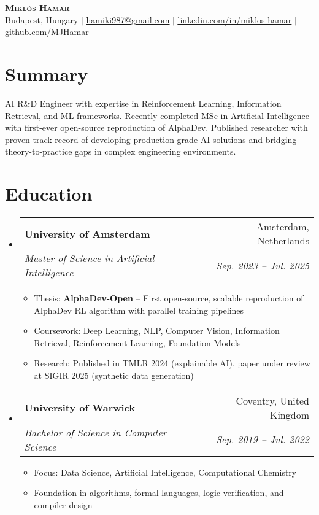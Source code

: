 \documentclass[letterpaper,11pt]{article}
\makeatletter
\newcommand{\resumeItem}[1]{
  \item\small{
    {#1 \vspace{-2pt}}
  }
}
\newcommand{\resumeSubheading}[4]{
  \vspace{-2pt}\item
    \begin{tabular*}{0.97\textwidth}[t]{l@{\extracolsep{\fill}}r}
      \textbf{#1} & #2 \\
      \textit{\small#3} & \textit{\small #4} \\
    \end{tabular*}\vspace{-7pt}
}
\newcommand{\resumeSubHeadingListStart}{\begin{itemize}[leftmargin=0.15in, label={}]}
\newcommand{\resumeSubHeadingListEnd}{\end{itemize}}
\newcommand{\resumeItemListStart}{\begin{itemize}}
\newcommand{\resumeItemListEnd}{\end{itemize}\vspace{-5pt}}
\makeatother
\begin{document}
\begin{center}
    \textbf{\Huge \scshape Miklós Hamar} \\ \vspace{1pt}
    \small Budapest, Hungary $|$ \href{mailto:hamiki987@gmail.com}{\underline{hamiki987@gmail.com}} $|$ 
    \href{https://linkedin.com/in/miklos-hamar}{\underline{linkedin.com/in/miklos-hamar}} $|$
    \href{https://github.com/MJHamar}{\underline{github.com/MJHamar}}
\end{center}


\section{Summary}
\small{AI R\&D Engineer with expertise in Reinforcement Learning, Information Retrieval, and ML frameworks. Recently completed MSc in Artificial Intelligence with first-ever open-source reproduction of AlphaDev. Published researcher with proven track record of developing production-grade AI solutions and bridging theory-to-practice gaps in complex engineering environments.}


\section{Education}
  \resumeSubHeadingListStart
    \resumeSubheading
      {University of Amsterdam}{Amsterdam, Netherlands}
      {Master of Science in Artificial Intelligence}{Sep. 2023 -- Jul. 2025}
      \resumeItemListStart
        \resumeItem{Thesis: \textbf{AlphaDev-Open} -- First open-source, scalable reproduction of AlphaDev RL algorithm with parallel training pipelines}
        \resumeItem{Coursework: Deep Learning, NLP, Computer Vision, Information Retrieval, Reinforcement Learning, Foundation Models}
        \resumeItem{Research: Published in TMLR 2024 (explainable AI), paper under review at SIGIR 2025 (synthetic data generation)}
      \resumeItemListEnd
      
    \resumeSubheading
      {University of Warwick}{Coventry, United Kingdom}
      {Bachelor of Science in Computer Science}{Sep. 2019 -- Jul. 2022}
      \resumeItemListStart
        \resumeItem{Focus: Data Science, Artificial Intelligence, Computational Chemistry}
        \resumeItem{Foundation in algorithms, formal languages, logic verification, and compiler design}
      \resumeItemListEnd
  \resumeSubHeadingListEnd


\end{document}
